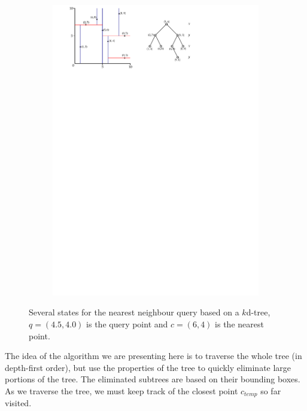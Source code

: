 \begin{figure}
\begin{subfigure}[b]{0.6\linewidth}
    \includegraphics[page=5,width=\textwidth]{figs/kdtree_nn.pdf}
    \caption{}
  \end{subfigure}
\caption{Several states for the nearest neighbour query based on a $k$d-tree, $q=(4.5, 4.0)$ is the query point and $c=(6,4)$ is the nearest point.}%
\end{figure}


%

The idea of the algorithm we are presenting here is to traverse the whole tree (in depth-first order), but use the properties of the tree to quickly eliminate large portions of the tree.
The eliminated subtrees are based on their bounding boxes.
As we traverse the tree, we must keep track of the closest point $c_{temp}$ so far visited.


